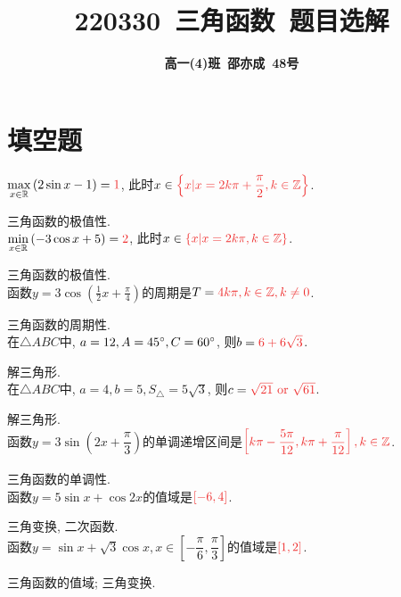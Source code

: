 \documentclass[8pt]{article}
\author{\normalfont\sffamily\large\bfseries{高一(4)班\ 邵亦成\ 48号}}
\title{\normalfont\sffamily\huge\bfseries{\textcolor{allanblue}{220330}\ \textcolor{allancyan}{三角函数}\ 题目选解}}
\date{}
\begin{document}
	\maketitle

	\section{填空题}
		$\displaystyle \max_{x\in\RR}{\left(2\sin x-1\right)}=\ansmath{1}$, 此时$x\in\ansmath{\left\{x|x=2k\pi+\dfrac{\pi}{2}, k\in\ZZ\right\}}$.

		三角函数的极值性.
		~\\

		$\displaystyle \min_{x\in\RR}{\left(-3\cos x+5\right)}=\ansmath{2}$, 此时$x\in\ansmath{\left\{x|x=2k\pi, k\in\ZZ\right\}}$.

		三角函数的极值性.
		~\\

		函数$\displaystyle y=3\cos\left(\frac{1}{2}x+\frac{\pi}{4}\right)$的周期是$T=\ansmath{4k\pi, k\in\ZZ, k\neq 0}$.

		三角函数的周期性.
		~\\

		在$\triangle ABC$中, $a=12, A=45^\circ, C=60^\circ$, 则$b=\ansmath{6+6\sqrt{3}}$.

		解三角形.
		~\\

		在$\triangle ABC$中, $a=4, b=5, S_{\triangle}=5\sqrt{3}$, 则$c=\ansmath{\sqrt{21} \lgor \sqrt{61}}$.

		解三角形.
		~\\

		函数$y=3\sin\left(2x+\dfrac{\pi}{3}\right)$的单调递增区间是$\displaystyle\ansmath{\left[k\pi-\frac{5\pi}{12}, k\pi+\frac{\pi}{12}\right], k\in \ZZ}$.

		三角函数的单调性.
		~\\

		函数$y=5\sin x+\cos 2x$的值域是$\ansmath{[-6, 4]}$.

		三角变换, 二次函数.
		~\\

		函数$y=\sin x +\sqrt{3} \cos x, x\in\left[-\dfrac{\pi}{6}, \dfrac{\pi}{3}\right]$的值域是$\ansmath{[1, 2]}$.

		三角函数的值域; 三角变换.
		~\\
\end{document}
